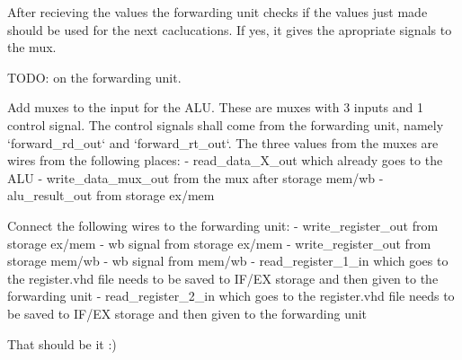 After recieving the values the forwarding unit checks if the values just made should be used for the next
caclucations.
If yes, it gives the apropriate signals to the mux.


TODO: on the forwarding unit.

Add muxes to the input for the ALU.
These are muxes with 3 inputs and 1 control signal.
The control signals shall come from the forwarding unit, namely `forward\_rd\_out` and `forward\_rt\_out`.
The three values from the muxes are wires from the following places:
- read\_data\_X\_out which already goes to the ALU
- write\_data\_mux\_out from the mux after storage mem/wb
- alu\_result\_out from storage ex/mem

Connect the following wires to the forwarding unit:
- write\_register\_out from storage ex/mem
- wb signal from storage ex/mem
- write\_register\_out from storage mem/wb
- wb signal from mem/wb
- read\_register\_1\_in which goes to the register.vhd file needs to be saved to IF/EX storage
and then given to the forwarding unit
- read\_register\_2\_in which goes to the register.vhd file needs to be saved to IF/EX storage
and then given to the forwarding unit

That should be it :)
